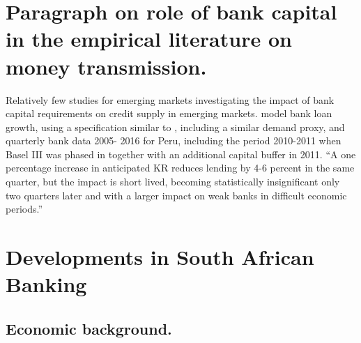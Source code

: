 \documentclass[
]{article}
\begin{document}
\hypertarget{paragraph-on-role-of-bank-capital-in-the-empirical-literature-on-money-transmission.}{%
\section{Paragraph on role of bank capital in the empirical literature on money transmission.}\label{paragraph-on-role-of-bank-capital-in-the-empirical-literature-on-money-transmission.}}

Relatively few studies for emerging markets investigating the impact of bank capital requirements on credit supply in emerging markets. \citet{fang2020bank} model bank loan growth, using a specification similar to \citet{aiyar2016does}, including a similar demand proxy, and quarterly bank data 2005- 2016 for Peru, including the period 2010-2011 when Basel III was phased in together with an additional capital buffer in 2011. ``A one percentage increase in anticipated KR reduces lending by 4-6 percent in the same quarter, but the impact is short lived, becoming statistically insignificant only two quarters later and with a larger impact on weak banks in difficult economic periods.''

\citet{osborne2017good}

\citet{jokipii2008cyclical}

\citet{gambacorta2004does}

\citet{schwert2018bank}

\citet{kim2017effect}

\citet{carlson2013capital}

\citet{tabak2011bank}

\citet{altunbas2004bank}

\citet{gambacorta2018bank}

\citet{berrospide2010effects}

\hypertarget{developments-in-south-african-banking}{%
\section{Developments in South African Banking}\label{developments-in-south-african-banking}}

\hypertarget{economic-background.}{%
\subsection{Economic background.}\label{economic-background.}}
\end{document}
